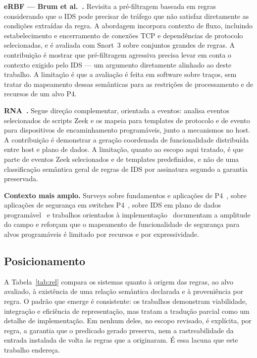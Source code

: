 \documentclass[conference]{IEEEtran}
\begin{document}
\textbf{eRBF --- Brum et al.~\cite{brum2025rethinking}.} Revisita a
pré-filtragem baseada em regras considerando que o IDS pode precisar de
tráfego que não satisfaz diretamente as condições extraídas da regra. A
abordagem incorpora contexto de fluxo, incluindo estabelecimento e
encerramento de conexões TCP e dependências de protocolo selecionadas, e é
avaliada com Snort~3 sobre conjuntos grandes de regras. A contribuição é
mostrar que pré-filtragem agressiva precisa levar em conta o contexto exigido
pelo IDS --- um argumento diretamente alinhado ao deste trabalho. A limitação
é que a avaliação é feita em software sobre traços, sem tratar do mapeamento
dessas semânticas para as restrições de processamento e de recursos de um
alvo P4.

\textbf{RNA~\cite{hagen2025rna}.} Segue direção complementar, orientada a
eventos: analisa eventos selecionados de scripts Zeek e os mapeia para
templates de protocolo e de evento para dispositivos de encaminhamento
programáveis, junto a mecanismos no host. A contribuição é demonstrar a
geração coordenada de funcionalidade distribuída entre host e plano de dados.
A limitação, quanto ao escopo aqui tratado, é que parte de eventos Zeek
selecionados e de templates predefinidos, e não de uma classificação semântica
geral de regras de IDS por assinatura segundo a garantia preservada.

\textbf{Contexto mais amplo.} Surveys sobre fundamentos e aplicações de
P4~\cite{hauser2023p4survey}, sobre aplicações de segurança em switches
P4~\cite{alsabeh2022p4securitysurvey}, sobre IDS em plano de dados
programável~\cite{fida2026pdpids} e trabalhos orientados à
implementação~\cite{mazloum2025p4security} documentam a amplitude do campo e
reforçam que o mapeamento de funcionalidade de segurança para alvos
programáveis é limitado por recursos e por expressividade.

\subsection{Posicionamento}

A Tabela~\ref{tab:rel} compara os sistemas quanto à origem das regras, ao alvo
avaliado, à existência de uma relação semântica declarada e à proveniência por
regra. O padrão que emerge é consistente: os trabalhos demonstram viabilidade,
integração e eficiência de representação, mas tratam a tradução parcial como
um detalhe de implementação. Em nenhum deles, no escopo revisado, é explícita,
por regra, a garantia que o predicado gerado preserva, nem a rastreabilidade
da entrada instalada de volta às regras que a originaram. É essa lacuna que
este trabalho endereça.
\end{document}
